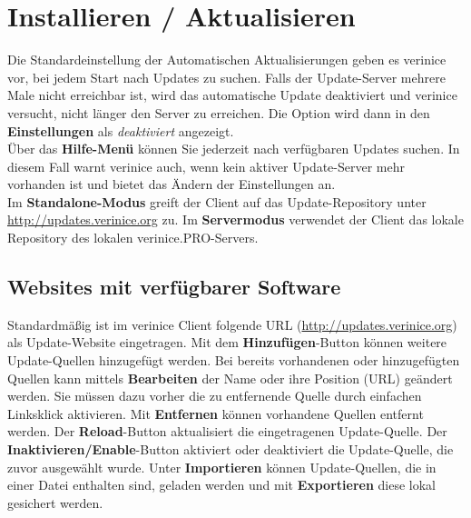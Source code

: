 \documentclass[a4paper,10pt]{book}
\begin{document}
\section{Installieren / Aktualisieren} \label{Installieren / Aktualisieren}
Die Standardeinstellung der Automatischen Aktualisierungen geben es verinice vor, bei jedem Start nach Updates zu suchen.
Falls der Update-Server mehrere Male nicht erreichbar ist, wird das automatische Update deaktiviert und verinice versucht,
nicht länger den Server zu erreichen. Die Option wird dann in den \textbf{Einstellungen} als {\em deaktiviert} angezeigt.
\newline\\
Über das \textbf{Hilfe-Menü} können Sie jederzeit nach verfügbaren Updates suchen. In diesem Fall warnt verinice auch, wenn kein
aktiver Update-Server mehr vorhanden ist und bietet das Ändern der Einstellungen an.
\newline\\
Im \textbf{Standalone-Modus} greift der Client auf das Update-Repository unter \href{http://updates.verinice.org}{http://updates.verinice.org} zu.
Im \textbf{Servermodus} verwendet der Client das lokale Repository des lokalen verinice.\textsc{PRO}-Servers.

\subsection{Websites mit verfügbarer Software}
Standardmäßig ist im verinice Client folgende URL (\href{http://updates.verinice.org}{http://updates.verinice.org}) als Update-Website eingetragen. Mit dem \textbf{Hinzufügen}-Button
können weitere Update-Quellen hinzugefügt werden. Bei bereits vorhandenen oder hinzugefügten Quellen kann mittels \textbf{Bearbeiten} der
Name oder ihre Position (URL) geändert werden. Sie müssen dazu vorher die zu entfernende Quelle durch einfachen Linksklick aktivieren.
Mit \textbf{Entfernen} können vorhandene Quellen entfernt werden. Der \textbf{Reload}-Button aktualisiert die eingetragenen Update-Quelle.
Der \textbf{Inaktivieren/Enable}-Button aktiviert oder deaktiviert die Update-Quelle, die zuvor ausgewählt wurde. Unter \textbf{Importieren} können
Update-Quellen, die in einer Datei enthalten sind, geladen werden und mit \textbf{Exportieren} diese lokal gesichert werden.
\end{document}
